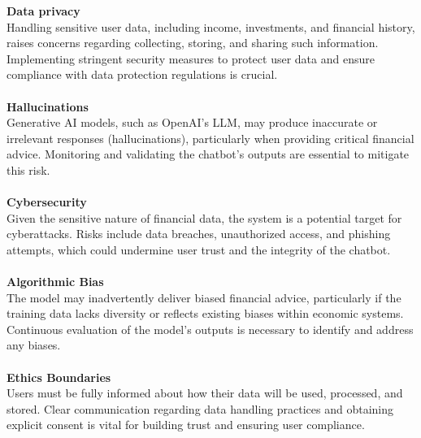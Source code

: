 \documentclass{article}
\begin{document}
    \textbf{Data privacy} \vspace{0.1cm} \\ 
    Handling sensitive user data, including income, investments, and financial history, raises concerns regarding collecting, storing, and sharing such information. Implementing stringent security measures to protect user data and ensure compliance with data protection regulations is crucial. \\\\
    \textbf{Hallucinations} \vspace{0.1cm} \\ 
    Generative AI models, such as OpenAI's LLM, may produce inaccurate or irrelevant responses (hallucinations), particularly when providing critical financial advice. Monitoring and validating the chatbot's outputs are essential to mitigate this risk. \\\\
    \textbf{Cybersecurity} \vspace{0.1cm} \\
    Given the sensitive nature of financial data, the system is a potential target for cyberattacks. Risks include data breaches, unauthorized access, and phishing attempts, which could undermine user trust and the integrity of the chatbot. \\\\
    \textbf{Algorithmic Bias} \vspace{0.1cm}\\
    The model may inadvertently deliver biased financial advice, particularly if the training data lacks diversity or reflects existing biases within economic systems. Continuous evaluation of the model's outputs is necessary to identify and address any biases. \\\\
    \textbf{Ethics Boundaries} \vspace{0.1cm} \\
    Users must be fully informed about how their data will be used, processed, and stored. Clear communication regarding data handling practices and obtaining explicit consent is vital for building trust and ensuring user compliance. \\\\



\printbibliography
\end{document}
